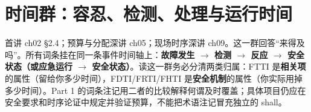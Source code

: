 \section{时间群：容忍、检测、处理与运行时间}

\begin{noteblock}
首讲 ch02 §2.4；预算与分配深讲 ch05；现场时序深讲 ch09。这一群回答“来得及吗”。所有词条挂在同一条事件时间轴上：\textbf{故障发生 \(\rightarrow\) 检测 \(\rightarrow\) 反应 \(\rightarrow\) 安全状态（或应急运行 \(\rightarrow\) 安全状态）}。读这一群务必分清两类归属：FTTI 是\textbf{相关项}的属性（留给你多少时间），FDTI/FRTI/FHTI 是\textbf{安全机制}的属性（你实际用掉多少时间）。Part 1 的词条注记用二者的比较解释何谓及时覆盖；具体项目仍应在安全要求和时序论证中规定并验证预算，不能把术语注记冒充独立的 shall。
\end{noteblock}

